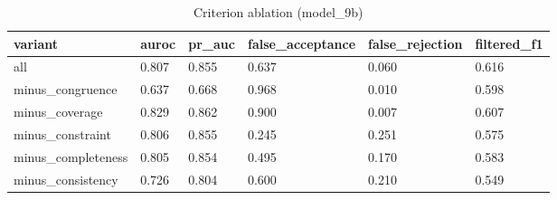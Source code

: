 \begin{table}[t]
\centering
\small
\begin{tabular}{llllll}
\hline
variant & auroc & pr\_auc & false\_acceptance & false\_rejection & filtered\_f1 \\
\hline
all & 0.807 & 0.855 & 0.637 & 0.060 & 0.616 \\
minus\_congruence & 0.637 & 0.668 & 0.968 & 0.010 & 0.598 \\
minus\_coverage & 0.829 & 0.862 & 0.900 & 0.007 & 0.607 \\
minus\_constraint & 0.806 & 0.855 & 0.245 & 0.251 & 0.575 \\
minus\_completeness & 0.805 & 0.854 & 0.495 & 0.170 & 0.583 \\
minus\_consistency & 0.726 & 0.804 & 0.600 & 0.210 & 0.549 \\
\hline
\end{tabular}
\caption{Criterion ablation (model\_9b)}
\label{tab:ablation_model_9b}
\end{table}
